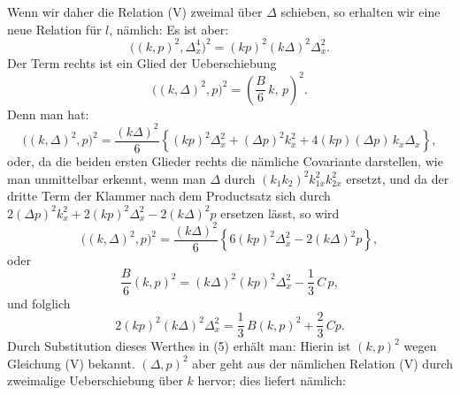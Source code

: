 Wenn wir daher die Relation (V) zweimal über $\Delta$ schieben, so erhalten wir eine neue Relation für $l$, nämlich:
Es ist aber:
\[
\big((k,p)^2,\Delta_x^4\big)^2 = (kp)^2(k\Delta)^2\Delta_x^2.
\]
Der Term rechts ist ein Glied der Ueberschiebung
\[
\big((k,\Delta)^2,p\big)^2 = \left(\frac{B}{6}\,k,\,p\right)^2.
\]
Denn man hat:
\[
\big((k,\Delta)^2,p\big)^2 = \frac{(k\Delta)^2}{6}\left\{ (kp)^2\Delta_x^2 + (\Delta p)^2 k_x^2 + 4(kp)(\Delta p)\,k_x\Delta_x \right\},
\]
oder, da die beiden ersten Glieder rechts die nämliche Covariante darstellen, wie man unmittelbar erkennt, wenn man $\Delta$ durch $(k_1 k_2)^2 k_{1x}^2 k_{2x}^2$ ersetzt, und da der dritte Term der Klammer nach dem Productsatz sich durch $2(\Delta p)^2 k_x^2 + 2(kp)^2\Delta_x^2 - 2(k\Delta)^2 p$ ersetzen lässt, so wird
\[
\big((k,\Delta)^2,p\big)^2 = \frac{(k\Delta)^2}{6}\left\{ 6(kp)^2\Delta_x^2 - 2(k\Delta)^2 p \right\},
\]
oder
\[
\frac{B}{6}(k,p)^2 = (k\Delta)^2(kp)^2\Delta_x^2 - \frac{1}{3}\,C\,p,
\]
und folglich
\[
2(kp)^2(k\Delta)^2\Delta_x^2 = \frac{1}{3}\,B(k,p)^2 + \frac{2}{3}\,Cp.
\]
Durch Substitution dieses Werthes in (5) erhält man:
Hierin ist $(k,p)^2$ wegen Gleichung (V) bekannt. $(\Delta,p)^2$ aber geht aus der nämlichen Relation (V) durch zweimalige Ueberschiebung über $k$ hervor; dies liefert nämlich:



